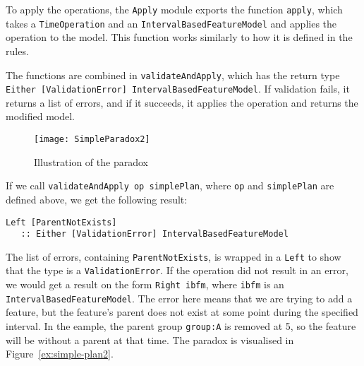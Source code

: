 To apply the operations, the \texttt{Apply} module exports the function \texttt{apply}, which takes a \texttt{Time\-Operation} and an \texttt{Interval\-Based\-Feature\-Model} and applies the operation to the model. This function works similarly to how it is defined in the rules.

The functions are combined in \texttt{validate\-And\-Apply}, which has the return type \texttt{Either [Validation\-Error] Interval\-Based\-Feature\-Model}. If validation fails, it returns a list of errors, and if it succeeds, it applies the operation and returns the modified model.
\begin{figure}
   \centering
      \texttt{[image: SimpleParadox2]}
   \caption{Illustration of the paradox}
   \label{ex:simple-plan2}
\end{figure}
If we call \texttt{validateAndApply op simplePlan}, where \texttt{op} and \texttt{simplePlan} are defined above, we get the following result:
\begin{verbatim}
Left [ParentNotExists] 
   :: Either [ValidationError] IntervalBasedFeatureModel
\end{verbatim}
The list of errors, containing \texttt{Parent\-Not\-Exists}, is wrapped in a \texttt{Left} to show that the type is a \texttt{Validation\-Error}. If the operation did not result in an error, we would get a result on the form \texttt{Right ibfm}, where \texttt{ibfm} is an \texttt{Interval\-Based\-Feature\-Model}. The error here means that we are trying to add a feature, but the feature's parent does not exist at some point during the specified interval. In the eample, the parent group \texttt{group:A} is removed at 5, so the feature will be without a parent at that time. The paradox is visualised in Figure~\vref{ex:simple-plan2}.

